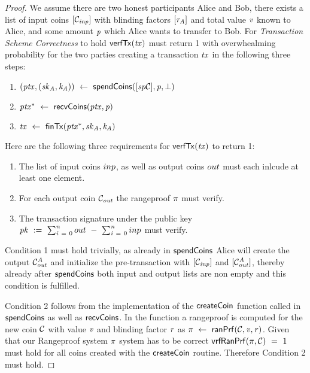 \begin{proof}
    We assume there are two honest participants Alice and Bob, there exists a list of input coins $[\mathcal{C}_{\mathit{inp}}]$ with blinding factors $[\mathit{r}_{\mathit{A}}]$ and total value $\mathit{v}$ known to Alice, and some amount $\mathit{p}$ which Alice wants to transfer to Bob.
    For \emph{Transaction Scheme Correctness} to hold $\mathsf{verfTx}(\mathit{tx})$ must return 1 with overwhealming probability for the two parties creating a transaction $\mathit{tx}$ in the following three steps:
    \begin{enumerate}
        \item $(\mathit{ptx}, (\mathit{sk}_{\mathit{A}}, \mathit{\mathit{k}_{\mathit{A}}})) ~\leftarrow~ \mathsf{spendCoins}([\mathit{sp}\mathcal{C}],\mathit{p},\bot)$
        \item $\mathit{ptx}^* ~\leftarrow~ \mathsf{recvCoins}(\mathit{ptx},\mathit{p})$
        \item $\mathit{tx} ~\leftarrow~ \mathsf{finTx}(\mathit{ptx}^*,\mathit{sk}_{\mathit{A}},\mathit{\mathit{k}_{\mathit{A}}})$
    \end{enumerate}
    Here are the following three requirements for $\mathsf{verfTx}(\mathit{tx})$ to return 1:
    \begin{enumerate}
        \item The list of input coins $inp$, as well as output coins $out$ must each inlcude at least one element.
        \item For each output coin $\mathcal{C}_{\mathit{out}}$ the rangeproof $\pi$ must verify.
        \item The transaction signature under the public key $\mathit{pk} ~:=~ \sum_{\mathit{i} ~=~ 0}^{\mathit{n}} out ~-~ \sum_{\mathit{i} ~=~ 0}^{\mathit{n}} inp$ must verify.
    \end{enumerate}

    Condition 1 must hold trivially, as already in $\mathsf{spendCoins}$ Alice will create the output $\mathcal{C}_{\mathit{out}}^{\mathit{A}}$ and initialize the pre-transaction with $[\mathcal{C}_{\mathit{inp}}]$ and $[\mathcal{C}_{\mathit{out}}^{\mathit{A}}]$, thereby already after $\mathsf{spendCoins}$ both input and output lists are non empty and this condition is fulfilled.

    Condition 2 follows from the implementation of the $\mathsf{createCoin}$ function called in $\mathsf{spendCoins}$ as well as $\mathsf{recvCoins}$.
    In the function a rangeproof is computed for the new coin $\mathcal{C}$ with value $\mathit{v}$ and blinding factor $\mathit{r}$ as $\pi ~\leftarrow~ \mathsf{ranPrf}(\mathcal{C},\mathit{v},\mathit{r})$.
    Given that our Rangeproof system $\pi$ system has to be correct $\mathsf{vrfRanPrf}(\pi,\mathcal{C}) ~=~ 1$ must hold for all coins created with the $\mathsf{createCoin}$ routine.
    Therefore Condition 2 must hold.


\end{proof}
